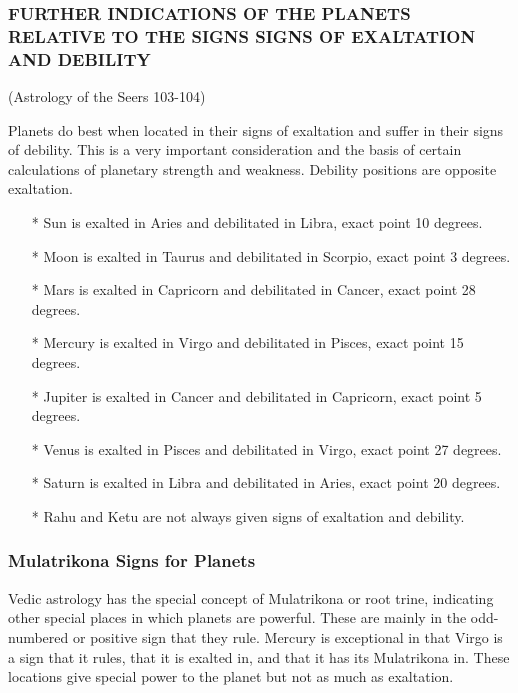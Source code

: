 \subsubsection{FURTHER INDICATIONS OF THE PLANETS RELATIVE TO THE SIGNS
SIGNS OF EXALTATION AND DEBILITY }

(Astrology of the Seers 103-104)

 

Planets do best when located in their signs of exaltation and suffer in their signs of debility. This is a very important consideration and the basis of certain calculations of planetary strength and weakness. Debility positions are opposite exaltation.

 

\begin{enumerate}
\item[*] Sun is exalted in Aries and debilitated in Libra, exact point 10 degrees.
\item[*] Moon is exalted in Taurus and debilitated in Scorpio, exact point 3 degrees.
\item[*] Mars is exalted in Capricorn and debilitated in Cancer, exact point 28 degrees.
\item[*] Mercury is exalted in Virgo and debilitated in Pisces, exact point 15 degrees.
\item[*] Jupiter is exalted in Cancer and debilitated in Capricorn, exact point 5 degrees.
\item[*] Venus is exalted in Pisces and debilitated in Virgo, exact point 27 degrees.
\item[*] Saturn is exalted in Libra and debilitated in Aries, exact point 20 degrees.
\item[*] Rahu and Ketu are not always given signs of exaltation and debility.
 \end{enumerate}

\subsubsection{Mulatrikona Signs for Planets}

 

Vedic astrology has the special concept of Mulatrikona or root trine, indicating other special places in which planets are powerful. These are mainly in the odd-numbered or positive sign that they rule. Mercury is exceptional in that Virgo is a sign that it rules, that it is exalted in, and that it has its Mulatrikona in. These locations give special power to the planet but not as much as exaltation.

